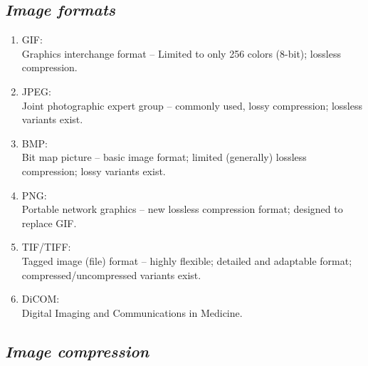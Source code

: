 \documentclass{response}
\begin{document}
\newpage

\subsection*{\Huge\em Image formats }
\bigskip


{\large 

\begin{enumerate}\setlength\itemsep{-0.5em}
\item GIF: \\
Graphics interchange format -- Limited to only 256 colors (8-bit); lossless compression.
\item JPEG: \\
Joint photographic expert group -- commonly used, lossy compression; lossless variants exist.
\item BMP: \\
Bit map picture -- basic image format; limited (generally) lossless compression; lossy variants exist.
\item PNG: \\
Portable network graphics -- new lossless compression format; designed to replace GIF.
\item TIF/TIFF: \\
Tagged image (file) format -- highly flexible; detailed and adaptable format; compressed/uncompressed variants exist.
\item DiCOM: \\
Digital Imaging and Communications in Medicine.
\end{enumerate}
}


\newpage

\subsection*{\Huge\em Image compression }
\bigskip
\end{document}
